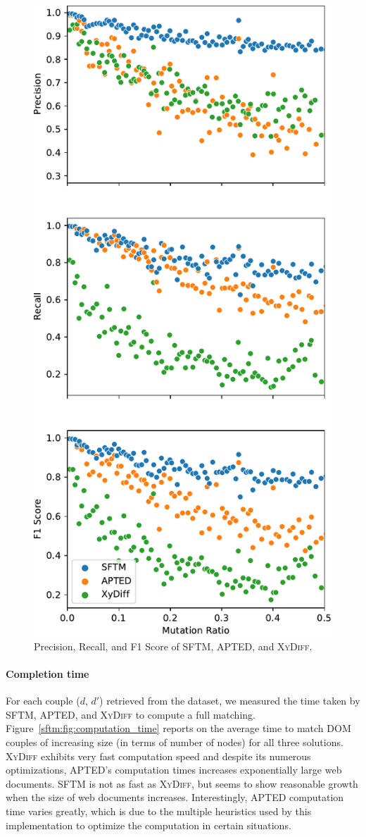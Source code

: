 \begin{figure}
  \centering
  \includegraphics[width=.65\linewidth]{tree-matching/graphs/f1score}
  \caption{Precision, Recall, and F1 Score of SFTM, APTED, and \textsc{XyDiff}.}
  \label{sftm:fig:f1score}
\end{figure}

\paragraph{Completion time}
For each couple ($d$, $d'$) retrieved from the dataset, we measured the time taken by SFTM, APTED, and \textsc{XyDiff} to compute a full matching.
Figure~\ref{sftm:fig:computation_time} reports on the average time to match DOM couples of increasing size (in terms of number of nodes) for all three solutions.
\textsc{XyDiff} exhibits very fast computation speed and despite its numerous optimizations, APTED's computation times increases exponentially large web documents.
SFTM is not as fast as \textsc{XyDiff}, but seems to show reasonable growth when the size of web documents increases.
Interestingly, APTED computation time varies greatly, which is due to the multiple heuristics used by this implementation to optimize the computation in certain situations.

